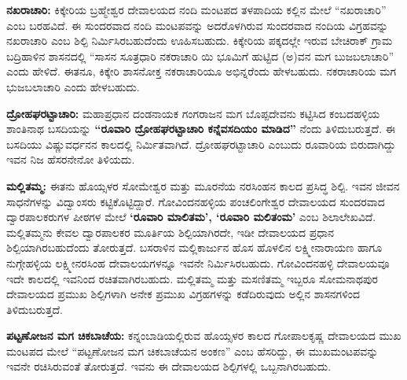 \textbf{ನಖರಾಚಾರಿ:} ಕಿಕ್ಕೇರಿಯ ಬ್ರಹ್ಮೇಶ್ವರ ದೇವಾಲಯದ ನಂದಿ ಮಂಟಪದ ತಳಪಾದಿಯ ಕಲ್ಲಿನ ಮೇಲೆ “ನಖರಾಚಾರಿ” ಎಂಬ ಬರಹವಿದೆ. ಈ ಸುಂದರವಾದ ನಂದಿ ಮಂಟಪವನ್ನು ಅದರೊಳಗಿರುವ ಸುಂದರವಾದ ನಂದಿಯ ವಿಗ್ರಹವನ್ನು ನಖರಾಚಾರಿ ಎಂಬ ಶಿಲ್ಪಿ ನಿರ್ಮಿಸಿರಬಹುದೆಂದು ಊಹಿಸಬಹುದು. ಕಿಕ್ಕೇರಿಯ ಪಕ್ಕದಲ್ಲೇ ಇರುವ ಬೇಚಿರಾಕ್​ ಗ್ರಾಮ ಬದ್ರಿಹಾಳಿನ ಶಾಸನದಲ್ಲಿ “ಸಾಸನ ಸೂತ್ರಧಾರಿ ನಕರಾಚಾರಿ ಯಿ ಭೂಮಿಗೆ ಹುಟ್ಟಿದ (ಅ)ವನ ಮಗ ಬುಜಬಲಾಚಾರಿ” ಎಂದು ಹೇಳಿದೆ. ಈತನೂ, ಕಿಕ್ಕೇರಿ ಶಾಸನೋಕ್ತ ನಕರಾಚಾರಿಯೂ ಅಭಿನ್ನರೆಂದು ಹೇಳಬಹುದು. ನಕರಾಚಾರಿಯ ಮಗ ಭುಜಬಲಾಚಾರಿ ಎಂದು ಹೇಳಬಹುದು.

\textbf{ದ್ರೋಹಘರಟ್ಟಾಚಾರಿ:} ಮಹಾಪ್ರಧಾನ ದಂಡನಾಯಕ ಗಂಗರಾಜನ ಮಗ ಬೊಪ್ಪದೇವನು ಕಟ್ಟಿಸಿದ ಕಂಬದಹಳ್ಳಿಯ ಶಾಂತಿನಾಥ ಬಸದಿಯನ್ನು \textbf{“ರೂವಾರಿ ದ್ರೋಹಘರಟ್ಟಾಚಾರಿ ಕನ್ನೆವಸದಿಯಂ ಮಾಡಿದ” }ನೆಂದು ತಿಳಿದುಬರುತ್ತದೆ. ಈ ಬಸದಿಯು ವಿಷ್ಣುವರ್ಧನನ ಕಾಲದಲ್ಲಿ ನಿರ್ಮಿತವಾಗಿದೆ. ದ್ರೋಹಘರಟ್ಟಾಚಾರಿ ಎಂಬುದು ರೂವಾರಿಯ ಬಿರುದಾಗಿದ್ದು ಇವನ ನಿಜ ಹೆಸರನೇನೋ ತಿಳಿಯದು.

\textbf{ಮಲ್ಲಿತಮ್ಮ:} ಈತನು ಹೊಯ್ಸಳರ ಸೋಮೇಶ್ವರ ಮತ್ತು ಮೂರನೆಯ ನರಸಿಂಹನ ಕಾಲದ ಪ್ರಸಿದ್ಧ ಶಿಲ್ಪಿ. ಇವನ ಜೀವನ ಸಾಧನೆಗಳನ್ನು ವಿದ್ವಾಂಸರು ಕಟ್ಟಿಕೊಟ್ಟಿದ್ದಾರೆ. ಗೋವಿಂದನಹಳ್ಳಿಯ ಪಂಚಲಿಂಗೇಶ್ವರ ದೇವಾಲಯದ ಸುಂದರವಾದ ದ್ವಾರಪಾಲಕರುಗಳ ಪೀಠಗಳ ಮೇಲೆ \textbf{‘ರೂವಾರಿ ಮಾಲಿತಮ’, ‘ರೂವಾರಿ ಮಲಿತಂಮ’} ಎಂಬ ಶಿಲಾಲೇಖವಿದೆ. ಮಲ್ಲಿತಮ್ಮನು ಕೇವಲ ದ್ವಾರಪಾಲಕರ ಮೂರ್ತಿಯ ಶಿಲ್ಪಿಯಾಗಿರದೇ, ಇಡೀ ದೇವಾಲಯದ ಪ್ರಧಾನ ಶಿಲ್ಪಿಯಾಗಿರಬಹುದೆಂದು ತೋರುತ್ತದೆ. ಬಸರಾಳಿನ ಮಲ್ಲಿಕಾರ್ಜುನ ಹೊಸ ಹೊಳಲಿನ ಲಕ್ಷ್ಮೀನಾರಾಯಣ ಹಾಗೂ ನುಗ್ಗೇಹಳ್ಳಿಯ ಲಕ್ಷ್ಮೀನರಸಿಂಹ ದೇವಾಲಯಗಳನ್ನೂ ಇವನೇ ನಿರ್ಮಿಸಿರಬಹುದು. ಗೋವಿಂದನಹಳ್ಳಿ ದೇವಾಲಯವೂ ಇದೇ ಕಾಲದಲ್ಲಿ ಇವನಿಂದ ರಚಿತವಾಗಿರಬಹುದು. ಮಲ್ಲಿತಮ್ಮ ಮತ್ತು ಮಸಣಿತಮ್ಮ ಇಬ್ಬರೂ ಸೋಮನಾಥಪುರ ದೇವಾಲಯದ ಪ್ರಮುಖ ಶಿಲ್ಪಿಗಳಾಗಿ ಅನೇಕ ಪ್ರಮುಖ ವಿಗ್ರಹಗಳನ್ನು ಕಡೆದಿರುವುದು ಅಲ್ಲಿನ ಶಾಸನಗಳಿಂದ ತಿಳಿದುಬರುತ್ತದೆ.

\textbf{ಪಟ್ಟಣೋಜನ ಮಗ ಚಿಕಬಾಚೆಯ:} ಕನ್ನಂಬಾಡಿಯಲ್ಲಿರುವ ಹೊಯ್ಸಳರ ಕಾಲದ ಗೋಪಾಲಕೃಷ್ಣ ದೇವಾಲಯದ ಮುಖ ಮಂಟಪದ ಮೇಲೆ “ಪಟ್ಟಣೋಜನ ಮಗ ಚಿಕಬಾಚೆಯನ ಅಂಕಣ” ಎಂಬ ಹೆಸರಿದ್ದು, ಈ ಮುಖಮಂಟಪವನ್ನು ಇವನೇ ರಚಿಸಿರುವಂತೆ ತೋರುತ್ತದೆ. ಇವನು ಈ ದೇವಾಲಯದ ಶಿಲ್ಪಿಗಳಲ್ಲಿ ಒಬ್ಬನಾಗಿರಬಹುದು.



